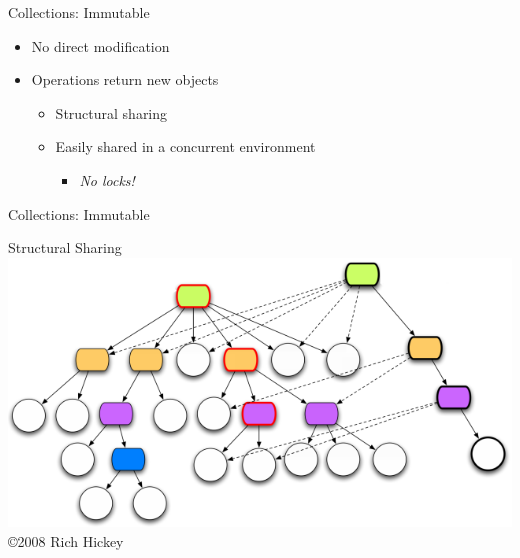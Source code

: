 \documentclass[14pt,t,usepdftitle=false,xcolornames=x11names,svgnames,dvipsnames,usenames]{beamer}
\begin{document}
\begin{frame}{Collections: Immutable}
  \begin{itemize}[<+->]
    \item No direct modification
    \item Operations return new objects
      \begin{itemize}
        \item Structural sharing
        \item Easily shared in a concurrent environment
        \begin{itemize}
          \item \emph{No locks!}
        \end{itemize}
      \end{itemize}
  \end{itemize}
\end{frame}

\begin{frame}{Collections: Immutable}
  \begin{center}
    Structural Sharing\\
    \includegraphics[scale=.65]{images/clojure-trees.png}\\
    \tiny{\textcolor{keyword}{\copyright 2008 Rich Hickey}}
  \end{center}
\end{frame}
\end{document}
